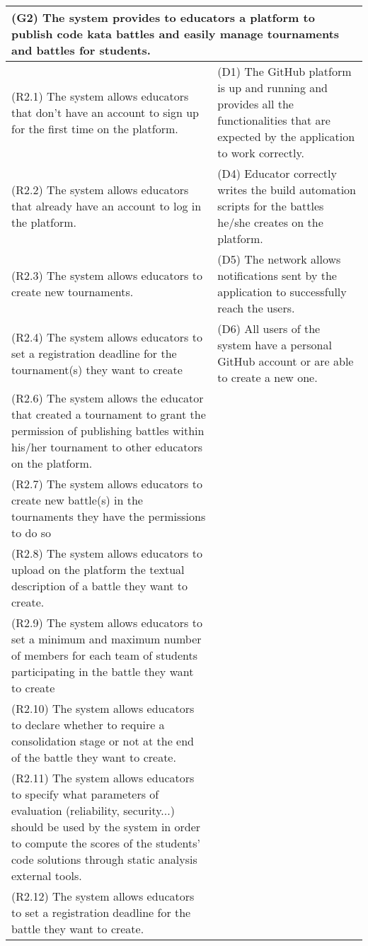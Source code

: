 \begin{longtable}{|p{8cm}|p{8cm}|}
\hline
\multicolumn{2}{|p{16cm}|}{\textbf{(G2) The system provides to educators a platform to publish code kata battles and easily manage tournaments and battles for students.}}\\
\hline
(R2.1) The system allows educators that don’t have an account to sign up for the first time on the platform. & (D1) The GitHub platform is up and running and provides all the functionalities that are expected by the application to work correctly. \\
(R2.2) The system allows educators that already have an account to log in the platform. & (D4) Educator correctly writes the build automation scripts for the battles he/she creates on the platform. \\
(R2.3) The system allows educators to create new tournaments. & (D5) The network allows notifications sent by the application to successfully reach the users. \\
(R2.4) The system allows educators to set a registration deadline for the tournament(s) they want to create & (D6) All users of the system have a personal GitHub account or are able to create a new one. \\
(R2.6) The system allows the educator that created a tournament to grant the permission of publishing battles within his/her tournament to other educators on the platform. & \\
(R2.7) The system allows educators to create new battle(s) in the tournaments they have the permissions to do so & \\
(R2.8) The system allows educators to upload on the platform the textual description of a battle they want to create. & \\
(R2.9) The system allows educators to set a minimum and maximum number of members for each team of students participating in the battle they want to create & \\
(R2.10) The system allows educators to declare whether to require a consolidation stage or not at the end of the battle they want to create. & \\
(R2.11) The system allows educators to specify what parameters of evaluation (reliability, security...) should be used by the system in order to compute the scores of the students' code solutions through static analysis external tools. & \\
(R2.12) The system allows educators to set a registration deadline for the battle they want to create. & \\

\end{longtable}
